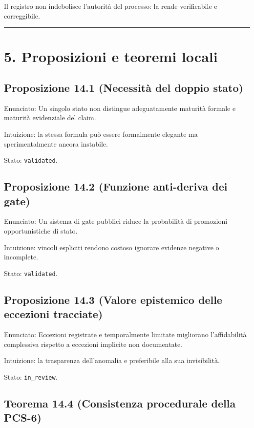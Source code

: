 Il registro non indebolisce l'autorità del processo: la rende verificabile e correggibile.

\begin{center}\rule{0.5\linewidth}{0.5pt}\end{center}

\section{5. Proposizioni e teoremi locali}

\subsection{Proposizione 14.1 (Necessità del doppio stato)}

Enunciato:
Un singolo stato non distingue adeguatamente maturità formale e maturità evidenziale del claim.

Intuizione:
la stessa formula può essere formalmente elegante ma sperimentalmente ancora instabile.

Stato: \texttt{validated}.

\subsection{Proposizione 14.2 (Funzione anti-deriva dei gate)}

Enunciato:
Un sistema di gate pubblici riduce la probabilità di promozioni opportunistiche di stato.

Intuizione:
vincoli espliciti rendono costoso ignorare evidenze negative o incomplete.

Stato: \texttt{validated}.

\subsection{Proposizione 14.3 (Valore epistemico delle eccezioni tracciate)}

Enunciato:
Eccezioni registrate e temporalmente limitate migliorano l'affidabilità complessiva rispetto a eccezioni implicite non documentate.

Intuizione:
la trasparenza dell'anomalia e preferibile alla sua invisibilità.

Stato: \texttt{in\_review}.

\subsection{Teorema 14.4 (Consistenza procedurale della PCS-6)}

